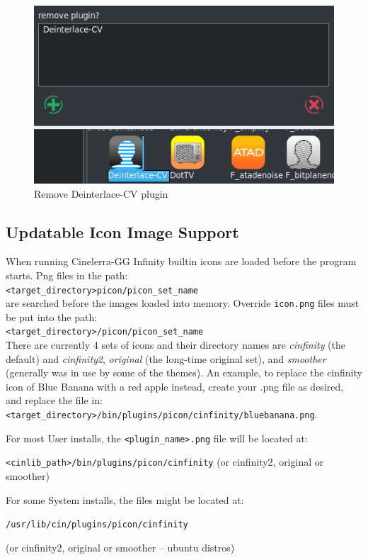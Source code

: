 \begin{figure}[htpb]
    \centering
    \includegraphics[width=0.6\linewidth]{images/remove-effect.png}
    \caption{Remove Deinterlace-CV plugin}
    \label{fig:remove-effect}
\end{figure}

\subsection{Updatable Icon Image Support}%
\label{sub:updatable_icon_image_support}

When running Cinelerra-GG Infinity builtin icons are loaded before the program starts. Png files in the path: \\ \texttt{<target\_directory>picon/picon\_set\_name} \\
are searched before the images loaded into memory. Override \texttt{icon.png} files must be put into the path: \\ \texttt{<target\_directory>/picon/picon\_set\_name} \\
There are currently 4 sets of icons and their directory names are \textit{cinfinity} (the default) and \textit{cinfinity2}, \textit{original} (the long-time original set), and \textit{smoother} (generally was in use by some of the themes). An example, to replace the cinfinity icon of Blue Banana with a red apple instead, create your .png file as desired, and replace the file in: \\
\texttt{<target\_directory>/bin/plugins/picon/cinfinity/bluebanana.png}.

For most User installs, the \texttt{<plugin\_name>.png} file will be located at:

\texttt{<cinlib\_path>/bin/plugins/picon/cinfinity} (or cinfinity2, original or smoother)

For some System installs, the files might be located at:

\texttt{/usr/lib/cin/plugins/picon/cinfinity}

(or cinfinity2, original or smoother -- ubuntu distros)


